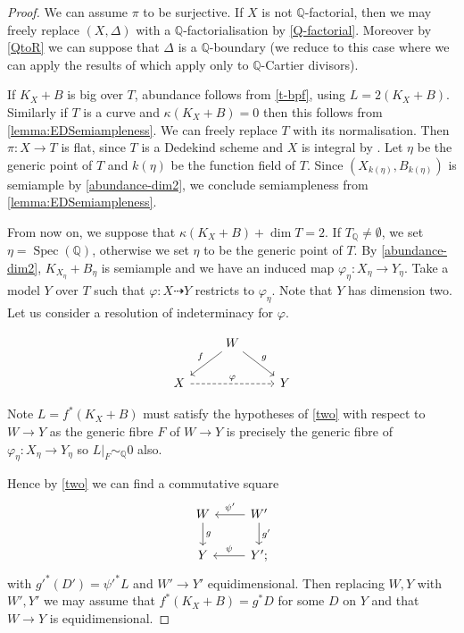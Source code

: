 \documentclass[a4paper,12pt]{book}
\DeclareMathOperator{\Spec}{Spec}
\begin{document}
	\begin{proof}
		We can assume $\pi$ to be surjective.
		If $X$ is not $\mathbb{Q}$-factorial, then we may freely replace $(X,\Delta)$ with a $\mathbb{Q}$-factorialisation by \autoref{Q-factorial}. Moreover by \autoref{QtoR} we can suppose that $\Delta$ is a $\mathbb{Q}$-boundary (we reduce to this case where we can apply the results of \cite{witaszek2020keels} which apply only to $\mathbb{Q}$-Cartier divisors).
		
		If $K_{X}+B$ is big over $T$, abundance follows from \autoref{t-bpf}, using $L=2(K_{X}+B)$. Similarly if $T$ is a curve and $\kappa(K_{X}+B)=0$ then this follows from \autoref{lemma:EDSemiampleness}. We can freely replace $T$ with its normalisation. Then $\pi \colon X \to T$ is flat, since $T$ is a Dedekind scheme and $X$ is integral by \cite[Proposition 9.7]{Ha77}. Let $\eta$ be the generic point of $T$ and $k(\eta)$ be the function field of $T$. Since $(X_{k(\eta)}, B_{k(\eta)})$ is semiample by \autoref{abundance-dim2}, we conclude semiampleness from \autoref{lemma:EDSemiampleness}. 
		
		From now on, we suppose that $\kappa(K_{X}+B)+\dim T=2$.
		If $T_\mathbb{Q} \neq \emptyset$, we set $\eta=\Spec(\mathbb{Q})$, otherwise we set $\eta$ to be the generic point of $T$. 
		By \autoref{abundance-dim2},  $K_{X_\eta}+B_\eta$ is semiample and we have an induced map $\varphi_{\eta} \colon X_{\eta} \to Y_{\eta}$.
		Take a model $Y$ over $T$ such that $\varphi \colon X \dashrightarrow Y$ restricts to $\varphi_{\eta}$. Note that $Y$ has dimension two. Let us consider a resolution of indeterminacy for $\varphi$.
		
		\[\begin{tikzcd}
		& W \arrow[ld, "f"'] \arrow[rd, "g"] &   \\
		X \arrow[rr, "\varphi", dashed] &                                   & Y
		\end{tikzcd}\]
		
		Note $L=f^{*}(K_{X}+B)$ must satisfy the hypotheses of \autoref{two} with respect to $W \to Y$ as the generic fibre $F$ of $W \to Y$ is precisely the generic fibre of $\varphi_{\eta} \colon X_{\eta} \to Y_{\eta}$ so $L|_{F}\sim_{\mathbb{Q}} 0$ also. 
		
		Hence by \autoref{two} we can find a commutative square
		\[\begin{tikzcd}
		W \arrow[d, "g"]  & W' \arrow[d, "g'"] \arrow[l, "\psi'"'] \\
		Y               & Y' ;   \arrow[l, "\psi"']               
		\end{tikzcd}\] 
		with $g'^{*}(D')=\psi'^{*}L$ and $W' \to Y'$ equidimensional. Then replacing $W,Y$ with $W',Y'$ we may assume that $f^{*}(K_{X}+B)=g^{*}D$ for some $D$ on $Y$ and that $W \to Y$ is equidimensional.
		

\end{proof}
\end{document}
